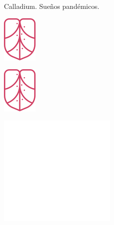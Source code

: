 \documentclass[12pt]{book}
\newcommand\nbvspace[1][3]{\vspace*{\stretch{#1}}}
\begin{document}
\pagecolor{lowpink}
\color{deeppink}

\begin{colophon}
Calladium. Sueños pandémicos.
\end{colophon}


\newpage
\thispagestyle{empty}

\includegraphics{cal_rosa.png}

\newpage
\pagecolor{titlepagecolor}
\includegraphics{cal_rosa.png}
\newpage

\pagecolor{titlepagecolor}
\nbvspace[3]
\hfill\includegraphics{cal-blanco-texto.png}\hfill
\nbvspace[3]

\end{document}
